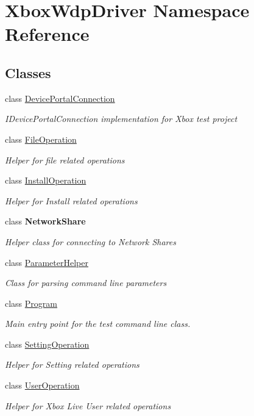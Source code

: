 \hypertarget{namespace_xbox_wdp_driver}{}\section{Xbox\+Wdp\+Driver Namespace Reference}
\label{namespace_xbox_wdp_driver}
\subsection*{Classes}
\begin{DoxyCompactItemize}
\item 
class \hyperlink{class_xbox_wdp_driver_1_1_device_portal_connection}{Device\+Portal\+Connection}
\begin{DoxyCompactList}\small\item\em I\+Device\+Portal\+Connection implementation for Xbox test project \end{DoxyCompactList}\item 
class \hyperlink{class_xbox_wdp_driver_1_1_file_operation}{File\+Operation}
\begin{DoxyCompactList}\small\item\em Helper for file related operations \end{DoxyCompactList}\item 
class \hyperlink{class_xbox_wdp_driver_1_1_install_operation}{Install\+Operation}
\begin{DoxyCompactList}\small\item\em Helper for Install related operations \end{DoxyCompactList}\item 
class {\bfseries Network\+Share}
\begin{DoxyCompactList}\small\item\em Helper class for connecting to Network Shares \end{DoxyCompactList}\item 
class \hyperlink{class_xbox_wdp_driver_1_1_parameter_helper}{Parameter\+Helper}
\begin{DoxyCompactList}\small\item\em Class for parsing command line parameters \end{DoxyCompactList}\item 
class \hyperlink{class_xbox_wdp_driver_1_1_program}{Program}
\begin{DoxyCompactList}\small\item\em Main entry point for the test command line class. \end{DoxyCompactList}\item 
class \hyperlink{class_xbox_wdp_driver_1_1_setting_operation}{Setting\+Operation}
\begin{DoxyCompactList}\small\item\em Helper for Setting related operations \end{DoxyCompactList}\item 
class \hyperlink{class_xbox_wdp_driver_1_1_user_operation}{User\+Operation}
\begin{DoxyCompactList}\small\item\em Helper for Xbox Live User related operations \end{DoxyCompactList}\end{DoxyCompactItemize}

